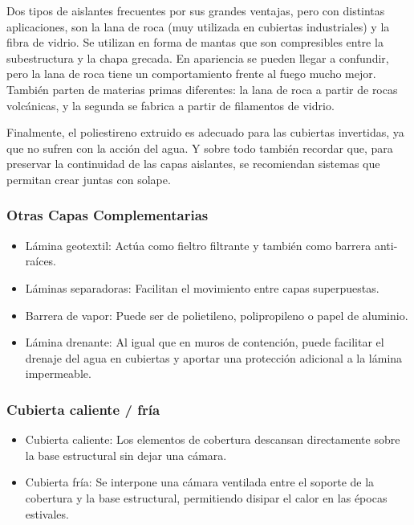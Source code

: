 Dos tipos de aislantes frecuentes por sus grandes ventajas, pero con distintas aplicaciones, son la lana de roca (muy utilizada en cubiertas industriales) y la fibra de vidrio. Se utilizan en forma de mantas que son compresibles entre la subestructura y la chapa grecada. En apariencia se pueden llegar a confundir, pero la lana de roca tiene un comportamiento frente al fuego mucho mejor. También parten de materias primas diferentes: la lana de roca a partir de rocas volcánicas, y la segunda se fabrica a partir de filamentos de vidrio.

Finalmente, el poliestireno extruido es adecuado para las cubiertas invertidas, ya que no sufren con la acción del agua. Y sobre todo también recordar que, para preservar la continuidad de las capas aislantes, se recomiendan sistemas que permitan crear juntas con solape.

\subsubsection*{Otras Capas Complementarias}

\begin{itemize}
    \item Lámina geotextil: Actúa como fieltro filtrante y también como barrera anti-raíces.
    \item Láminas separadoras: Facilitan el movimiento entre capas superpuestas.
    \item Barrera de vapor: Puede ser de polietileno, polipropileno o papel de aluminio.
    \item Lámina drenante: Al igual que en muros de contención, puede facilitar el drenaje del agua en cubiertas y aportar una protección adicional a la lámina impermeable.
\end{itemize}

\subsubsection*{Cubierta caliente / fría}

\begin{itemize}
    \item Cubierta caliente: Los elementos de cobertura descansan directamente sobre la base estructural sin dejar una cámara.
    \item Cubierta fría: Se interpone una cámara ventilada entre el soporte de la cobertura y la base estructural, permitiendo disipar el calor en las épocas estivales.
\end{itemize}

